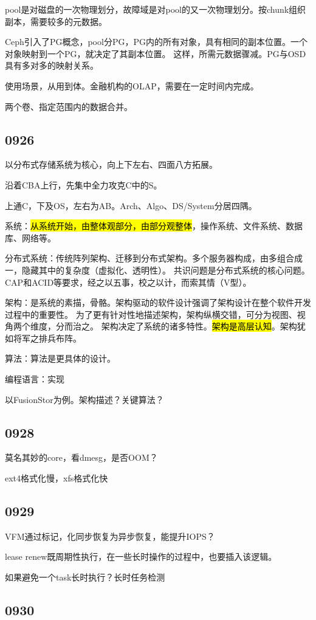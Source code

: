 pool是对磁盘的一次物理划分，故障域是对pool的又一次物理划分。按chunk组织副本，需要较多的元数据。

Ceph引入了PG概念，pool分PG，PG内的所有对象，具有相同的副本位置。一个对象映射到一个PG，就决定了其副本位置。
这样，所需元数据骤减。PG与OSD具有多对多的映射关系。

使用场景，从用到体。金融机构的OLAP，需要在一定时间内完成。

两个卷、指定范围内的数据合并。

\subsection{0926}

以分布式存储系统为核心，向上下左右、四面八方拓展。

沿着CBA上行，先集中全力攻克C中的S。

上通C，下及OS，左右为AB。Arch、Algo、DS/System分居四隅。

系统：\hl{从系统开始，由整体观部分，由部分观整体}，操作系统、文件系统、数据库、网络等。

分布式系统：传统阵列架构、迁移到分布式架构。多个服务器构成，由多组合成一，隐藏其中的复杂度（虚拟化、透明性）。
共识问题是分布式系统的核心问题。CAP和ACID等要求，经之以五事，校之以计，而索其情（V型）。

架构：是系统的素描，骨骼。架构驱动的软件设计强调了架构设计在整个软件开发过程中的重要性。
为了更有针对性地描述架构，架构纵横交错，可分为视图、视角两个维度，分而治之。
架构决定了系统的诸多特性。\hl{架构是高层认知}。架构犹如将军之排兵布阵。

算法：算法是更具体的设计。

编程语言：实现

以FusionStor为例。架构描述？关键算法？

\subsection{0928}

莫名其妙的core，看dmesg，是否OOM？

ext4格式化慢，xfs格式化快

\subsection{0929}

VFM通过标记，化同步恢复为异步恢复，能提升IOPS？

lease renew既周期性执行，在一些长时操作的过程中，也要插入该逻辑。

如果避免一个task长时执行？长时任务检测

\subsection{0930}
